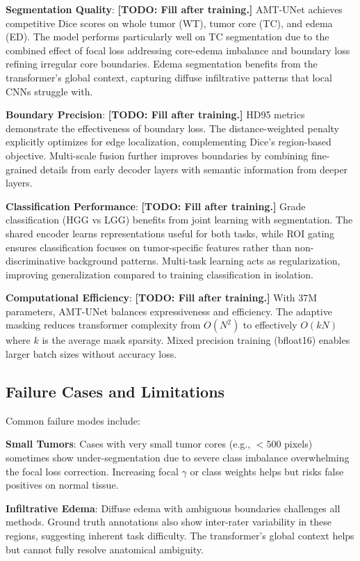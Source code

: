 \textbf{Segmentation Quality}: \textbf{[TODO: Fill after training.]} AMT-UNet achieves competitive Dice scores on whole tumor (WT), tumor core (TC), and edema (ED). The model performs particularly well on TC segmentation due to the combined effect of focal loss addressing core-edema imbalance and boundary loss refining irregular core boundaries. Edema segmentation benefits from the transformer's global context, capturing diffuse infiltrative patterns that local CNNs struggle with.

\textbf{Boundary Precision}: \textbf{[TODO: Fill after training.]} HD95 metrics demonstrate the effectiveness of boundary loss. The distance-weighted penalty explicitly optimizes for edge localization, complementing Dice's region-based objective. Multi-scale fusion further improves boundaries by combining fine-grained details from early decoder layers with semantic information from deeper layers.

\textbf{Classification Performance}: \textbf{[TODO: Fill after training.]} Grade classification (HGG vs LGG) benefits from joint learning with segmentation. The shared encoder learns representations useful for both tasks, while ROI gating ensures classification focuses on tumor-specific features rather than non-discriminative background patterns. Multi-task learning acts as regularization, improving generalization compared to training classification in isolation.

\textbf{Computational Efficiency}: \textbf{[TODO: Fill after training.]} With 37M parameters, AMT-UNet balances expressiveness and efficiency. The adaptive masking reduces transformer complexity from $O(N^2)$ to effectively $O(kN)$ where $k$ is the average mask sparsity. Mixed precision training (bfloat16) enables larger batch sizes without accuracy loss.

\subsection{Failure Cases and Limitations}

Common failure modes include:

\textbf{Small Tumors}: Cases with very small tumor cores (e.g., $<500$ pixels) sometimes show under-segmentation due to severe class imbalance overwhelming the focal loss correction. Increasing focal $\gamma$ or class weights helps but risks false positives on normal tissue.

\textbf{Infiltrative Edema}: Diffuse edema with ambiguous boundaries challenges all methods. Ground truth annotations also show inter-rater variability in these regions, suggesting inherent task difficulty. The transformer's global context helps but cannot fully resolve anatomical ambiguity.

